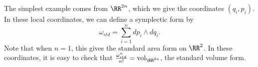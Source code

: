 

    The simplest example comes from $\RR^{2n}$, which we give the coordinates $(q_i, p_i)$. 
    In these local coordinates, we can define a symplectic form by  
        \[\omega_{std}=\sum_{i=1}^n d p_i\wedge d q_i.\] 
    Note that when $n=1$, this gives the standard area form on $\RR^2$.
    In these coordinates, it is easy to check that $\frac{\omega_{std}^n}{n!}=\text{vol}_{\RR^{2n}}$, the standard volume form.

